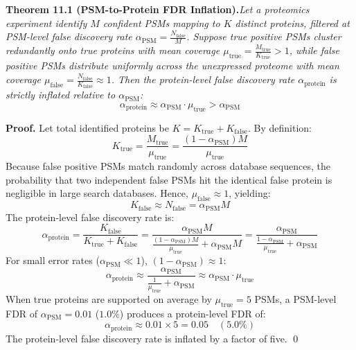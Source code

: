 \documentclass[11pt,twoside,openright]{book}
\begin{document}
\noindent\textbf{Theorem 11.1 (PSM-to-Protein FDR Inflation).}\enspace\textit{Let a proteomics experiment identify $M$ confident PSMs mapping to $K$ distinct proteins, filtered at PSM-level false discovery rate $\alpha_{\text{PSM}} = \frac{N_{\text{false}}}{M}$. Suppose true positive PSMs cluster redundantly onto true proteins with mean coverage $\mu_{\text{true}} = \frac{M_{\text{true}}}{K_{\text{true}}} > 1$, while false positive PSMs distribute uniformly across the unexpressed proteome with mean coverage $\mu_{\text{false}} = \frac{N_{\text{false}}}{K_{\text{false}}} \approx 1$. Then the protein-level false discovery rate $\alpha_{\text{protein}}$ is strictly inflated relative to $\alpha_{\text{PSM}}$:}
\begin{equation}
\alpha_{\text{protein}} \approx \alpha_{\text{PSM}} \cdot \mu_{\text{true}} > \alpha_{\text{PSM}}
\label{eq:protein_inflation}
\end{equation}

\noindent\textbf{Proof.}\enspace
Let total identified proteins be $K = K_{\text{true}} + K_{\text{false}}$.
By definition:
\begin{equation}
K_{\text{true}} = \frac{M_{\text{true}}}{\mu_{\text{true}}} = \frac{(1 - \alpha_{\text{PSM}}) M}{\mu_{\text{true}}}
\end{equation}
Because false positive PSMs match randomly across database sequences, the probability that two independent false PSMs hit the identical false protein is negligible in large search databases. Hence, $\mu_{\text{false}} \approx 1$, yielding:
\begin{equation}
K_{\text{false}} \approx N_{\text{false}} = \alpha_{\text{PSM}} M
\end{equation}
The protein-level false discovery rate is:
\begin{equation}
\alpha_{\text{protein}} = \frac{K_{\text{false}}}{K_{\text{true}} + K_{\text{false}}} = \frac{\alpha_{\text{PSM}} M}{\frac{(1 - \alpha_{\text{PSM}}) M}{\mu_{\text{true}}} + \alpha_{\text{PSM}} M} = \frac{\alpha_{\text{PSM}}}{\frac{1 - \alpha_{\text{PSM}}}{\mu_{\text{true}}} + \alpha_{\text{PSM}}}
\end{equation}
For small error rates ($\alpha_{\text{PSM}} \ll 1$), $(1 - \alpha_{\text{PSM}}) \approx 1$:
\begin{equation}
\alpha_{\text{protein}} \approx \frac{\alpha_{\text{PSM}}}{\frac{1}{\mu_{\text{true}}} + \alpha_{\text{PSM}}} \approx \alpha_{\text{PSM}} \cdot \mu_{\text{true}}
\end{equation}
When true proteins are supported on average by $\mu_{\text{true}} = 5$ PSMs, a PSM-level FDR of $\alpha_{\text{PSM}} = 0.01$ ($1.0\%$) produces a protein-level FDR of:
\begin{equation}
\alpha_{\text{protein}} \approx 0.01 \times 5 = 0.05 \quad (5.0\%)
\end{equation}
The protein-level false discovery rate is inflated by a factor of five. \qed
\end{document}
